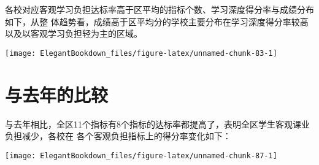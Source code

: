 \documentclass[cn, 11pt, fancy, hide]{elegantbook}
\begin{document}
各校对应客观学习负担达标率高于区平均的指标个数、学习深度得分率与成绩分布如下，从整
体趋势看，成绩高于区平均分的学校主要分布在学习深度得分率较高以及以客观学习负担轻为主的区域。

\begin{center}\texttt{[image: ElegantBookdown\_files/figure-latex/unnamed-chunk-83-1]} \end{center}

\hypertarget{section-27}{%
\section{与去年的比较}\label{section-27}}

与去年相比，全区11个指标有8个指标的达标率都提高了，表明全区学生客观课业负担减少，各校在
各个客观负担指标上的得分率变化如下：

\begin{center}\texttt{[image: ElegantBookdown\_files/figure-latex/unnamed-chunk-87-1]} \end{center}




\end{document}
